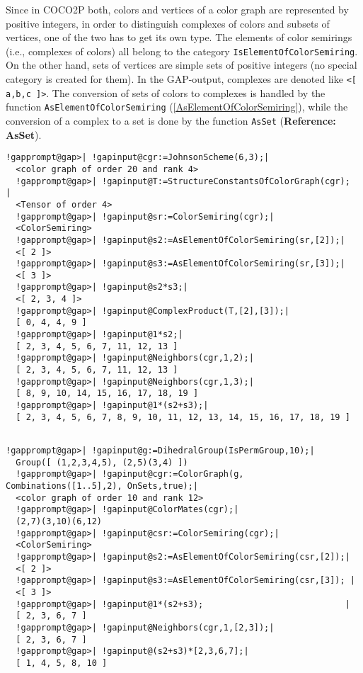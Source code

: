 \documentclass[a4paper,11pt]{report}
\begin{document}
{{ Since in \textsf{COCO2P} both, colors and vertices of a color graph are represented by positive
integers, in order to distinguish complexes of colors and subsets of vertices,
one of the two has to get its own type. The elements of color semirings (i.e.,
complexes of colors) all belong to the category \texttt{IsElementOfColorSemiring}. On the other hand, sets of vertices are simple sets of positive integers (no
special category is created for them). In the \textsf{GAP}-output, complexes are denoted like \texttt{{\textless}[ a,b,c ]{\textgreater}}. The conversion of sets of colors to complexes is handled by the function \texttt{AsElementOfColorSemiring} (\ref{AsElementOfColorSemiring}), while the conversion of a complex to a set is done by the function \texttt{AsSet} (\textbf{Reference: AsSet}). 
\begin{Verbatim}[commandchars=!@|,fontsize=\small,frame=single,label=Example]
  !gapprompt@gap>| !gapinput@cgr:=JohnsonScheme(6,3);|
  <color graph of order 20 and rank 4>
  !gapprompt@gap>| !gapinput@T:=StructureConstantsOfColorGraph(cgr);                       |
  <Tensor of order 4>
  !gapprompt@gap>| !gapinput@sr:=ColorSemiring(cgr);|
  <ColorSemiring>
  !gapprompt@gap>| !gapinput@s2:=AsElementOfColorSemiring(sr,[2]);|
  <[ 2 ]>
  !gapprompt@gap>| !gapinput@s3:=AsElementOfColorSemiring(sr,[3]);|
  <[ 3 ]>
  !gapprompt@gap>| !gapinput@s2*s3;|
  <[ 2, 3, 4 ]>
  !gapprompt@gap>| !gapinput@ComplexProduct(T,[2],[3]);|
  [ 0, 4, 4, 9 ]
  !gapprompt@gap>| !gapinput@1*s2;|
  [ 2, 3, 4, 5, 6, 7, 11, 12, 13 ]
  !gapprompt@gap>| !gapinput@Neighbors(cgr,1,2);|
  [ 2, 3, 4, 5, 6, 7, 11, 12, 13 ]
  !gapprompt@gap>| !gapinput@Neighbors(cgr,1,3);|
  [ 8, 9, 10, 14, 15, 16, 17, 18, 19 ]
  !gapprompt@gap>| !gapinput@1*(s2+s3);|
  [ 2, 3, 4, 5, 6, 7, 8, 9, 10, 11, 12, 13, 14, 15, 16, 17, 18, 19 ]
  	
\end{Verbatim}
 
\begin{Verbatim}[commandchars=!@|,fontsize=\small,frame=single,label=Example]
  !gapprompt@gap>| !gapinput@g:=DihedralGroup(IsPermGroup,10);|
  Group([ (1,2,3,4,5), (2,5)(3,4) ])
  !gapprompt@gap>| !gapinput@cgr:=ColorGraph(g, Combinations([1..5],2), OnSets,true);|
  <color graph of order 10 and rank 12>
  !gapprompt@gap>| !gapinput@ColorMates(cgr);|
  (2,7)(3,10)(6,12)
  !gapprompt@gap>| !gapinput@csr:=ColorSemiring(cgr);|
  <ColorSemiring>
  !gapprompt@gap>| !gapinput@s2:=AsElementOfColorSemiring(csr,[2]);|
  <[ 2 ]>
  !gapprompt@gap>| !gapinput@s3:=AsElementOfColorSemiring(csr,[3]); |
  <[ 3 ]>
  !gapprompt@gap>| !gapinput@1*(s2+s3);                            |
  [ 2, 3, 6, 7 ]
  !gapprompt@gap>| !gapinput@Neighbors(cgr,1,[2,3]);|
  [ 2, 3, 6, 7 ]
  !gapprompt@gap>| !gapinput@(s2+s3)*[2,3,6,7];|
  [ 1, 4, 5, 8, 10 ]
  	

\end{Verbatim}}}
\end{document}

